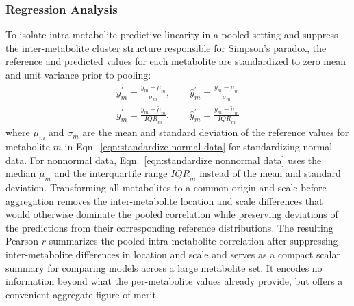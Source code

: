 \subsubsection{Regression Analysis}
\label{sec:Eval:subsec:multivariate:subsubsec:regression}
To isolate intra-metabolite predictive linearity in a pooled setting and suppress the inter-metabolite cluster structure responsible for Simpson's paradox, the reference and predicted values for each metabolite are standardized to zero mean and unit variance prior to pooling:
\begin{subequations}\label{eqn:standardized_pooled}
\begin{align}
    y^\prime_m = \frac{y_m - \mu_m}{\sigma_m}, \qquad \hat{y}^\prime_m = \frac{\hat{y}_m - \mu_m}{\sigma_m}\label{eqn:standardize normal data}\\
    y^\prime_m = \frac{y_m - \tilde{\mu}_m}{{IQR}_m}, \qquad \hat{y}^\prime_m = \frac{\hat{y}_m - \tilde{\mu}_m}{{IQR}_m}\label{eqn:standardize nonnormal data}
\end{align}
\end{subequations}
where $\mu_m$ and $\sigma_m$ are the mean and standard deviation of the reference values for metabolite $m$ in Eqn.~\ref{eqn:standardize normal data} for standardizing normal data. For nonnormal data, Eqn.~\ref{eqn:standardize nonnormal data} uses the median $\tilde{\mu}_m$ and the interquartile range ${IQR}_m$ instead of the mean and standard deviation. Transforming all metabolites to a common origin and scale before aggregation removes the inter-metabolite location and scale differences that would otherwise dominate the pooled correlation while preserving deviations of the predictions from their corresponding reference distributions. The resulting Pearson $r$ summarizes the pooled intra-metabolite correlation after suppressing inter-metabolite differences in location and scale and serves as a compact scalar summary for comparing models across a large metabolite set. It encodes no information beyond what the per-metabolite values already provide, but offers a convenient aggregate figure of merit.

